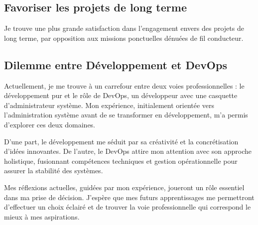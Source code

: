 \subsection{Favoriser les projets de long terme}
Je trouve une plus grande satisfaction dans l'engagement envers des projets de long terme, par opposition aux missions ponctuelles dénuées de fil conducteur.

\subsection{Dilemme entre Développement et DevOps}
Actuellement, je me trouve à un carrefour entre deux voies professionnelles : le développement pur et le rôle de DevOps, un développeur avec une casquette d'administrateur système.
Mon expérience, initialement orientée vers l'administration système avant de se transformer en développement, m'a permis d'explorer ces deux domaines.

D'une part, le développement me séduit par sa créativité et la concrétisation d'idées innovantes.
De l'autre, le DevOps attire mon attention avec son approche holistique, fusionnant compétences techniques et gestion opérationnelle pour assurer la stabilité des systèmes.

Mes réflexions actuelles, guidées par mon expérience, joueront un rôle essentiel dans ma prise de décision.
J'espère que mes futurs apprentissages me permettront d'effectuer un choix éclairé et de trouver la voie professionnelle qui correspond le mieux à mes aspirations.
